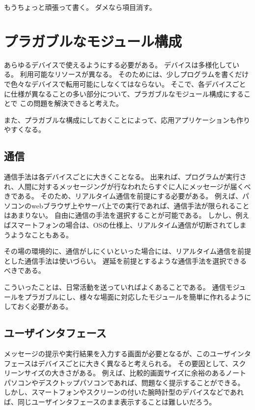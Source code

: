 もうちょっと頑張って書く。 ダメなら項目消す。

\section{プラガブルなモジュール構成}\label{ux30d7ux30e9ux30acux30d6ux30ebux306aux30e2ux30b8ux30e5ux30fcux30ebux69cbux6210}

あらゆるデバイスで使えるようにする必要がある。
デバイスは多様化している。 利用可能なリソースが異なる。
そのためには、少しプログラムを書くだけで色々なデバイスで転用可能にしなくてはならない。
そこで、各デバイスごとに仕様が異なることの多い部分について、プラガブルなモジュール構成にすることで
この問題を解決できると考えた。

また、プラガブルな構成にしておくことによって、応用アプリケーションも作りやすくなる。

\subsection{通信}\label{ux901aux4fe1}

通信手法は各デバイスごとに大きくことなる。
出来れば、プログラムが実行され、人間に対するメッセージングが行なわれたらすぐに人にメッセージが届くべきである。
そのため、リアルタイム通信を前提にする必要がある。
例えば、パソコンのwebブラウザ上やサーバ上での実行であれば、通信手法が限られることはあまりない。
自由に通信の手法を選択することが可能である。
しかし、例えばスマートフォンの場合は、OSの仕様上、リアルタイム通信が切断されてしまうようなこともある。

その場の環境的に、通信がしにくいといった場合には、リアルタイム通信を前提とした通信手法は使いづらい。
遅延を前提とするような通信手法を選択できるべきである。

こういったことは、日常活動を送っていればよくあることである。
通信モジュールをプラガブルにし、様々な場面に対応したモジュールを簡単に作れるようにしておく必要がある。

\subsection{ユーザインタフェース}\label{ux30e6ux30fcux30b6ux30a4ux30f3ux30bfux30d5ux30a7ux30fcux30b9}

メッセージの提示や実行結果を入力する画面が必要となるが、このユーザインタフェースはデバイスごとに大きく異なると考えられる。
その要因として、スクリーンサイズの大きさがある。
例えば、比較的画面サイズに余裕のあるノートパソコンやデスクトップパソコンであれば、問題なく提示することができる。
しかし、スマートフォンやスクリーンの付いた腕時計型のデバイスなどであれば、同じユーザインタフェースのまま表示することは難しいだろう。

